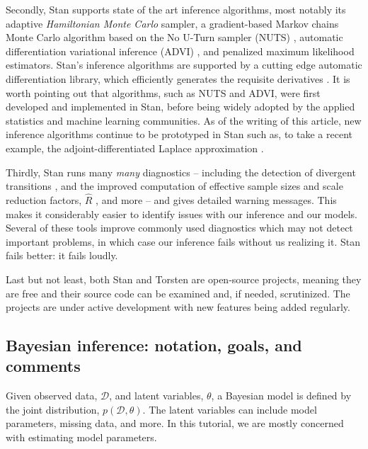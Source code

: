Secondly, Stan supports state of the art inference algorithms, most notably its adaptive \textit{Hamiltonian Monte Carlo} sampler, a gradient-based Markov chains Monte Carlo algorithm \citep{Betancourt:2018} based on the No U-Turn sampler (NUTS) \citep{Hoffman:2014}, automatic differentiation variational inference (ADVI) \citep{author:0000}, and penalized maximum likelihood estimators.
Stan's inference algorithms are supported by a cutting edge automatic differentiation library, which efficiently generates the requisite derivatives \cite{Carpenter:2015}.
It is worth pointing out that algorithms, such as NUTS and ADVI, were first developed and implemented in Stan, before being widely adopted by the applied statistics and machine learning communities.
As of the writing of this article, new inference algorithms continue to be prototyped in Stan such as, to take a recent example, the adjoint-differentiated Laplace approximation \citep{Margossian:2020}.

Thirdly, Stan runs many \textit{many} diagnostics -- including the detection of divergent transitions \cite{Betancourt:2018}, and the improved computation of effective sample sizes and scale reduction factors, $\hat R$ \cite{Vehtari:2020}, and more -- and gives detailed warning messages.
This makes it considerably easier to identify issues with our inference and our models.
Several of these tools improve commonly used diagnostics which may not detect important problems, in which case our inference fails without us realizing it.
Stan fails better: it fails loudly. 

Last but not least, both Stan and Torsten are open-source projects, meaning  they are free and their source code can be examined and, if needed, scrutinized. 
The projects are under active development with new features being added regularly.

\subsection{Bayesian inference: notation, goals, and comments}

Given observed data, $\mathcal D$, and latent variables, $\theta$, a Bayesian model is defined by the joint distribution, $p(\mathcal D, \theta)$.
The latent variables can include model parameters, missing data, and more.
In this tutorial, we are mostly concerned with estimating model parameters.

